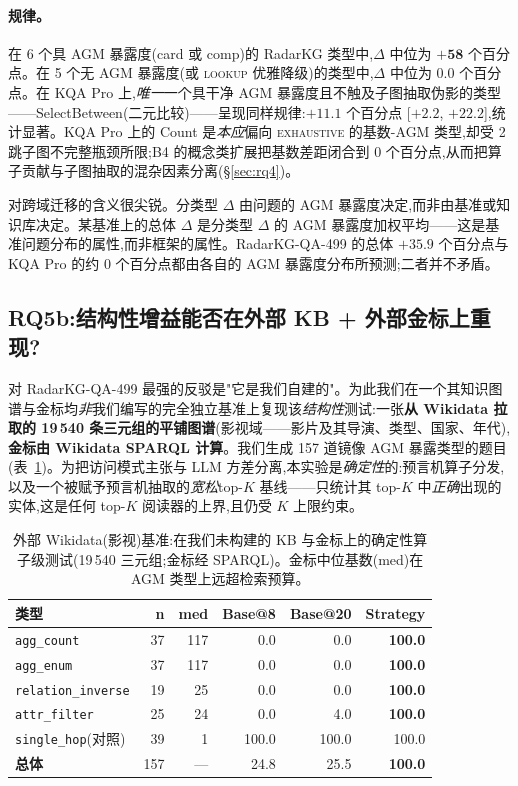 \documentclass[11pt,a4paper]{article}
\newcommand{\qtype}[1]{\texttt{\small #1}}
\newcommand{\op}[1]{\textsc{\small #1}}
\begin{document}
\paragraph{规律。}
在 6 个具 AGM 暴露度(\textsf{card} 或 \textsf{comp})的 RadarKG 类型中,$\Delta$ 中位为 $\mathbf{+58}$ 个百分点。在 5 个无 AGM 暴露度(或 \op{lookup} 优雅降级)的类型中,$\Delta$ 中位为 $\mathbf{0.0}$ 个百分点。在 KQA Pro 上,\emph{唯一}一个具干净 AGM 暴露度且不触及子图抽取伪影的类型——SelectBetween(二元比较)——呈现同样规律:$+11.1$ 个百分点 [$+2.2$, $+22.2$],统计显著。KQA Pro 上的 Count 是\emph{本应}偏向 \op{exhaustive} 的基数-AGM 类型,却受 2 跳子图不完整瓶颈所限;B4 的概念类扩展把基数差距闭合到 0 个百分点,从而把算子贡献与子图抽取的混杂因素分离(\S\ref{sec:rq4})。

对跨域迁移的含义很尖锐。分类型 $\Delta$ 由问题的 AGM 暴露度决定,而非由基准或知识库决定。某基准上的总体 $\Delta$ 是分类型 $\Delta$ 的 AGM 暴露度加权平均——这是基准问题分布的属性,而非框架的属性。RadarKG-QA-499 的总体 $+35.9$ 个百分点与 KQA Pro 的约 0 个百分点都由各自的 AGM 暴露度分布所预测;二者并不矛盾。

\subsection{RQ5b:结构性增益能否在外部 KB + 外部金标上重现?}
\label{sec:rq5b}
对 RadarKG-QA-499 最强的反驳是"它是我们自建的"。为此我们在一个其知识图谱与金标均\emph{非}我们编写的完全独立基准上复现该\emph{结构性}测试:一张\textbf{从 Wikidata 拉取的 19\,540 条三元组的平铺图谱}(影视域——影片及其导演、类型、国家、年代),\textbf{金标由 Wikidata SPARQL 计算}。我们生成 157 道镜像 AGM 暴露类型的题目(表~\ref{tab:ext})。为把访问模式主张与 LLM 方差分离,本实验是\emph{确定性}的:预言机算子分发,以及一个被赋予预言机抽取的\emph{宽松}top-$K$ 基线——只统计其 top-$K$ 中\emph{正确}出现的实体,这是任何 top-$K$ 阅读器的上界,且仍受 $K$ 上限约束。

\begin{table}[h]
\centering\small
\caption{外部 Wikidata(影视)基准:在我们未构建的 KB 与金标上的确定性算子级测试(19\,540 三元组;金标经 SPARQL)。金标中位基数(\textsf{med})在 AGM 类型上远超检索预算。}
\label{tab:ext}
\begin{tabular}{l r r r r r}
\toprule
\textbf{类型} & \textbf{n} & \textbf{med} & \textbf{Base@8} & \textbf{Base@20} & \textbf{Strategy} \\
\midrule
\qtype{agg\_count}        & 37 & 117 & 0.0 & 0.0 & \textbf{100.0} \\
\qtype{agg\_enum}         & 37 & 117 & 0.0 & 0.0 & \textbf{100.0} \\
\qtype{relation\_inverse} & 19 &  25 & 0.0 & 0.0 & \textbf{100.0} \\
\qtype{attr\_filter}      & 25 &  24 & 0.0 & 4.0 & \textbf{100.0} \\
\qtype{single\_hop}(对照) & 39 &   1 & 100.0 & 100.0 & 100.0 \\
\midrule
\textbf{总体}             & 157 & --- & 24.8 & 25.5 & \textbf{100.0} \\
\bottomrule
\end{tabular}
\end{table}
\end{document}
